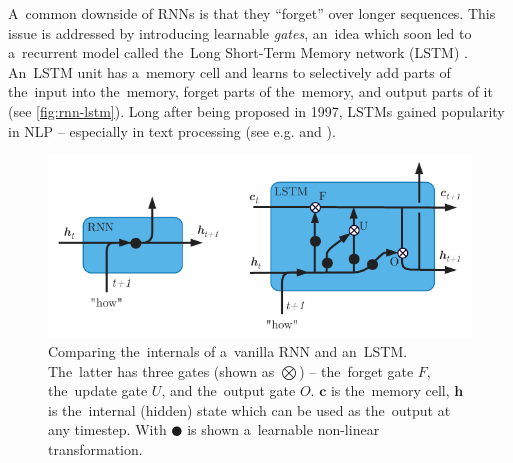 \documentclass[bsc,frontabs,singlespacing,parskip,deptreport]{infthesis}
\begin{document}
{{    A~common downside of RNNs is that they ``forget'' over longer sequences. This issue is addressed by introducing learnable \textit{gates}, an~idea which soon led to a~recurrent model called the~Long Short-Term Memory network (LSTM) \citep{Hochreiter_Schmidhuber_1997}. An~LSTM unit has a~memory cell and learns to selectively add parts of the~input into the~memory, forget parts of the~memory, and output parts of it (see \autoref{fig:rnn-lstm}). Long after being proposed in 1997, LSTMs gained popularity in NLP -- especially in text processing (see e.g. \citet{Mikolov_2010} and \citet{Graves_2013}). 
    \begin{figure}[h!t]
      \centering
      \includegraphics[width=13cm]{graphics/rnn-lstm}
      \caption{Comparing the~internals of a~vanilla RNN and an~LSTM. The~latter has three gates (shown as $\bigotimes$) -- the~forget gate $F$, the~update gate $U$, and the~output gate $O$. $\bm{c}$ is the~memory cell, $\bm{h}$ is the~internal (hidden) state which can be used as the~output at any timestep. With $\CIRCLE$ is shown a~learnable non-linear transformation.}
      \label{fig:rnn-lstm}
    \end{figure}

}}
\end{document}
